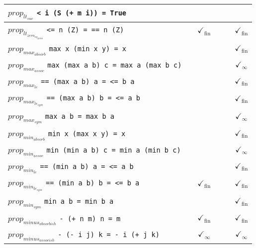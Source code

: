 \documentclass{article}
\begin{document}
\begin{longtable}{p{9cm} || c | c | c | c | c | }
\hline
$prop_{lt_{suc}}$ \newline \verb`< i (S (+ m i)) = True` &  &  &  &  &  \\
\hline
$prop_{lt_{zero_{eq_{zero}}}}$ \newline \verb`<= n (Z) = == n (Z)` &  & $\checkmark_{\mathrm{fin}}$ &  &  & $\checkmark_{\mathrm{fin}}$ \\
\hline
$prop_{max_{absorb}}$ \newline \verb`max x (min x y) = x` &  &  &  &  & $\checkmark_{\mathrm{fin}}$ \\
\hline
$prop_{max_{assoc}}$ \newline \verb`max (max a b) c = max a (max b c)` &  &  &  &  & $\checkmark_{\infty}$ \\
\hline
$prop_{max_{le}}$ \newline \verb`== (max a b) a = <= b a` &  &  &  &  & $\checkmark_{\mathrm{fin}}$ \\
\hline
$prop_{max_{le_{sym}}}$ \newline \verb`== (max a b) b = <= a b` &  &  &  &  & $\checkmark_{\mathrm{fin}}$ \\
\hline
$prop_{max_{sym}}$ \newline \verb`max a b = max b a` &  &  &  &  & $\checkmark_{\infty}$ \\
\hline
$prop_{min_{absorb}}$ \newline \verb`min x (max x y) = x` &  &  &  &  & $\checkmark_{\mathrm{fin}}$ \\
\hline
$prop_{min_{assoc}}$ \newline \verb`min (min a b) c = min a (min b c)` &  &  &  &  & $\checkmark_{\infty}$ \\
\hline
$prop_{min_{le}}$ \newline \verb`== (min a b) a = <= a b` &  &  &  &  & $\checkmark_{\mathrm{fin}}$ \\
\hline
$prop_{min_{le_{sym}}}$ \newline \verb`== (min a b) b = <= b a` &  & $\checkmark_{\mathrm{fin}}$ &  &  & $\checkmark_{\mathrm{fin}}$ \\
\hline
$prop_{min_{sym}}$ \newline \verb`min a b = min b a` &  &  &  &  & $\checkmark_{\mathrm{fin}}$ \\
\hline
$prop_{minus_{absorbish}}$ \newline \verb`- (+ n m) n = m` &  & $\checkmark_{\mathrm{fin}}$ &  &  & $\checkmark_{\mathrm{fin}}$ \\
\hline
$prop_{minus_{assocish}}$ \newline \verb`- (- i j) k = - i (+ j k)` &  & $\checkmark_{\infty}$ &  &  & $\checkmark_{\infty}$ \\

\end{longtable}
\end{document}
